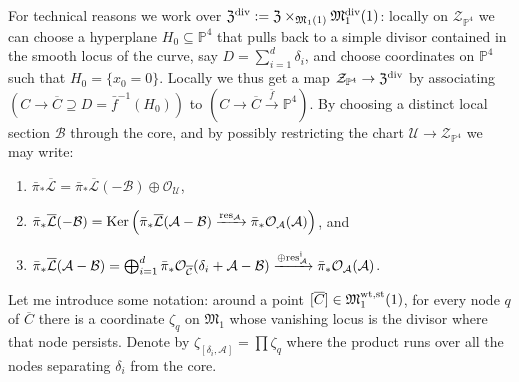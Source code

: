 \documentclass[11pt]{amsart}
\newcommand{\pazocal}{\mathcal}
\newcommand{\PP}{\mathbb P}
\newcommand{\OO}{\mathcal{O}}
\renewcommand{\to}{\rightarrow}
\newcommand{\MM}{\mathfrak M}
\newcommand{\hL}{\overline{\mathcal{L}}}
\theoremstyle{definition}
\theoremstyle{definition}
\begin{document}
For technical reasons we work over $\mathfrak Z^{\rm{div}}:=\mathfrak Z\times_{\MM_1(1)}\MM_1^{\textrm{div}}(1)$: locally on $\mathcal Z_{\PP^4}$ we can choose a hyperplane $H_0\subseteq\PP^4$ that pulls back to a simple divisor contained in the smooth locus of the curve, say $D=\sum_{i=1}^d \delta_i$, and choose coordinates on $\PP^4$ such that $H_0=\{x_0=0\}$. Locally we thus get a map $\mathcal Z_{\PP^4}\to \mathfrak Z^{\rm{div}}$ by associating $(C\to\overline{C}\supseteq D=\bar{f}^{-1}(H_0))$ to $(C\to \overline{C}\xrightarrow{\bar{f}}\PP^4)$. By choosing a distinct local section $\mathcal B$ through the core, and by possibly restricting the chart $\mathcal U\to\mathcal Z_{\PP^4}$ we may write:
\begin{enumerate}
 \item $\bar{\pi}_*\hL=\bar{\pi}_*\hL(-\mathcal B)\oplus\OO_{\mathcal U}$,
 \item $\bar{\pi}_*\hL(-\mathcal B)=\operatorname{Ker}\left(\bar{\pi}_*\hL(\mathcal A-\mathcal B)\xrightarrow{\rm{res}_{\mathcal A}}\bar{\pi}_*\OO_{\mathcal A}(\mathcal A)\right)$, and
 \item $\bar{\pi}_*\hL(\mathcal A-\mathcal B)=\bigoplus_{i=1}^d \bar{\pi}_*\OO_{\overline{\mathcal C}}(\delta_i+\mathcal A-\mathcal B)\xrightarrow{\oplus \rm{res}^i_{\mathcal A}}\bar{\pi}_*\OO_{\mathcal A}(\mathcal A)$.
\end{enumerate}

Let me introduce some notation: around a point $[\overline{C}]\in\MM_1^{\rm{wt,st}}(1)$, for every node $q$ of $\overline{C}$ there is a coordinate $\zeta_q$ on $\MM_1$ whose vanishing locus is the divisor where that node persists. Denote by $\zeta_{[\delta_i,\pazocal A]}=\prod\zeta_q$
where the product runs over all the nodes separating $\delta_i$ from the core.
 
\end{document}
